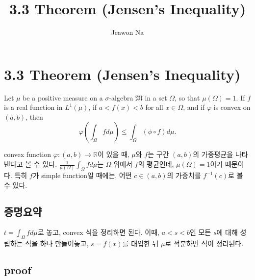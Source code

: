 \documentclass[11pt,reqno]{article}
\renewcommand{\(}{\left(}
\renewcommand{\)}{\right)}
\renewcommand{\[}{\left[}
\renewcommand{\]}{\right]}
\newcommand{\R}{\mathbb{R}}
\newcommand{\gap}{\vspace{5em}}
\newcommand{\M}{\mathfrak{M}}
\begin{document}
\title{3.3 Theorem (Jensen's Inequality)}
\author{Jeawon Na}
\date{}

\maketitle

\section{3.3 Theorem (Jensen's Inequality)}

Let $\mu$ be a positive measure on a $\sigma$-algebra $\M$ in a set $\Omega$, so that $\mu(\Omega) = 1$. If $f$ is
a real function in $L^1 (\mu)$, if $a < f(x) < b$ for all $x \in \Omega$, and if $\varphi$ is convex on $(a, b)$, then
\begin{equation}
  \varphi \( \int_\Omega f d\mu \) \le \int_\Omega (\phi \circ f) d\mu.
\end{equation}

\gap

convex function $\varphi: (a, b) \to \R$이 있을 때, $\mu$와 $f$는 구간 $(a, b)$의 가중평균을 나타낸다고 볼 수 있다. 
$\frac{1}{\mu(\Omega)} \int_\Omega f d\mu$는 $\Omega$ 위에서 $f$의 평균인데, $\mu (\Omega) = 1$이기 때문이다. 
특히 $f$가 simple function일 때에는, 어떤 $c \in (a, b)$의 가중치를 $f^{-1}({c})$로 볼 수 있다.

\gap

\subsection{증명요약}

$t = \int_\Omega f d\mu$로 놓고, convex 식을 정리하면 된다. 이때, $a < s < b$인 모든 $s$에 대해 성립하는 식을 하나 만들어놓고, 
$s = f(x)$를 대입한 뒤 $\mu$로 적분하면 식이 정리된다.

\gap

\subsection{proof}
\end{document}
